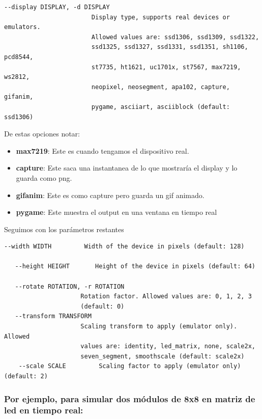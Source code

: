 \begin{Verbatim}[breaklines=true, breakanywhere=true]
   --display DISPLAY, -d DISPLAY
                        Display type, supports real devices or emulators.
                        Allowed values are: ssd1306, ssd1309, ssd1322,
                        ssd1325, ssd1327, ssd1331, ssd1351, sh1106, pcd8544,
                        st7735, ht1621, uc1701x, st7567, max7219, ws2812,
                        neopixel, neosegment, apa102, capture, gifanim,
                        pygame, asciiart, asciiblock (default: ssd1306)
\end{Verbatim}

De estas opciones notar:

\begin{itemize}
\itemsep1pt\parskip0pt
\item
  \textbf{max7219}: Este es cuando tengamos el dispositivo real.
\item
  \textbf{capture}: Este saca una instantanea de lo que mostraría el display y lo guarda como png.
\item
  \textbf{gifanim}: Este es como capture pero guarda un gif animado.
\item
  \textbf{pygame}: Este muestra el output en una ventana en tiempo real
\end{itemize}

Seguimos con los parámetros restantes

\begin{Verbatim}[breaklines=true, breakanywhere=true]
   --width WIDTH         Width of the device in pixels (default: 128)
   
   --height HEIGHT       Height of the device in pixels (default: 64)
   
   --rotate ROTATION, -r ROTATION
                     Rotation factor. Allowed values are: 0, 1, 2, 3
                     (default: 0)
   --transform TRANSFORM
                     Scaling transform to apply (emulator only). Allowed
                     values are: identity, led_matrix, none, scale2x,
                     seven_segment, smoothscale (default: scale2x)
    --scale SCALE         Scaling factor to apply (emulator only) (default: 2)
\end{Verbatim}

\subsubsection{Por ejemplo, para simular dos módulos de 8x8 en matriz de
led en tiempo
real:}\label{por-ejemplo-para-simular-dos-modulos-de-8x8-en-matriz-de-led-en-tiempo-real}

